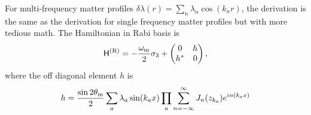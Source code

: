 For multi-frequency matter profiles $\delta \lambda(r) = \sum_n \lambda_n \cos (k_n r)$, the derivation is the same as the derivation for single frequency matter profiles but with more tedious math. The Hamiltonian in Rabi basis is
\begin{equation}
    \mathsf H^{(\mathrm R)} = -\frac{\omega_\mathrm m}{2}\sigma_3 + \begin{pmatrix}
        0 & h\\
        h^{*} & 0
        \end{pmatrix},
\end{equation}
where the off diagonal element $h$ is
\begin{equation}
    h = \frac{\sin 2\theta_\mathrm m}{2} \sum_a \lambda_a \sin (k_a x) \prod_{a} \sum_{n=-\infty}^{\infty} J_n (z_{k_a}) e^{i n(k_a x) }
\end{equation}

